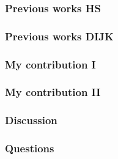 \documentclass[first,firstsupp,handout,last]{ETHclass}
\begin{document}
\begin{frame}
  \frametitle{Previous works HS}
\end{frame}

\begin{frame}
  \frametitle{Previous works DIJK}
\end{frame}

\begin{frame}
  \frametitle{My contribution I}
\end{frame}

\begin{frame}
  \frametitle{My contribution II}
\end{frame}

\begin{frame}
  \frametitle{Discussion}
\end{frame}

\begin{frame}
\frametitle{Questions}
\end{frame}





\end{document}
